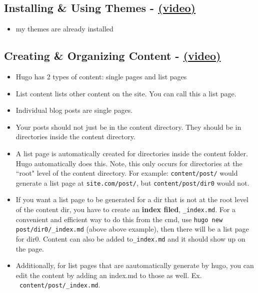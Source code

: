 \subsection{Installing \& Using Themes - \href{https://youtu.be/L34JL_3Jkyc?list=PLLAZ4kZ9dFpOnyRlyS-liKL5ReHDcj4G3}{(video)} }
\begin{itemize}
	\item my themes are already installed
\end{itemize}

\subsection{Creating \& Organizing Content - \href{https://youtu.be/0GZxidrlaRM?list=PLLAZ4kZ9dFpOnyRlyS-liKL5ReHDcj4G3}{(video)} }
\begin{itemize}
	\item
	Hugo has 2 types of content: single pages and list pages
	\item
	List content lists other content on the site. You can call this a list page.
	\item
	Individual blog posts are single pages.
	\item
	Your posts should not just be in the content directory. They should be in directories inside the content directory.
	\item
	A list page is automatically created for directories inside the content folder.  Hugo automatically does this. Note, this only occurs for directories at the ``root" level of the content directory. For example:  \texttt{content/post/} would generate a list page at \texttt{site.com/post/}, but \texttt{content/post/dir0} would not.
	\item
	If you want a list page to be generated for a dir that is not at the root level of the content dir, you have to create an \textbf{index filed}, \texttt{\_index.md}. For a convenient and efficient way to do this from the cmd, use \texttt{hugo new post/dir0/\_index.md} (above above example), then there will be a list page for dir0. 	Content can also be added to\texttt{\_index.md} and it should show up on the page.
	\item
	Additionally, for list pages that are aautomatically generate by hugo, you can edit the content by adding an index.md to those as well. Ex. \texttt{~content/post/\_index.md}.
\end{itemize}


